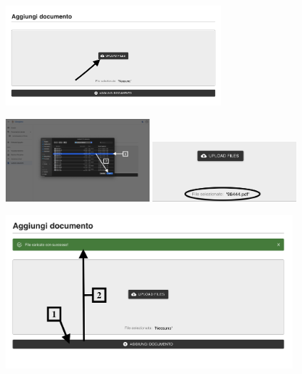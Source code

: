 \begin{center}
    \includegraphics[width=0.6\textwidth]{./img/PaginaGestioneDocumenti2.png}
    \label{fig:gestione2}
\end{center}

\begin{center}
    \includegraphics[width=0.4\textwidth]{./img/PaginaGestioneDocumenti3.png}
    \hspace{0.05\textwidth}
    \includegraphics[width=0.4\textwidth]{./img/GestioneDocumenti4.png}
    \label{fig:gestione3}
\end{center}

\begin{center}
    \includegraphics[width=0.8\textwidth]{./img/GestioneDocumenti5.png}
    \label{fig:gestione4}
\end{center}
